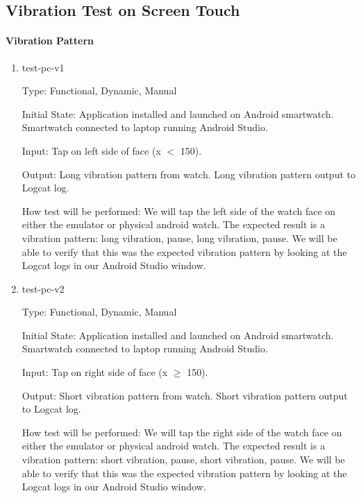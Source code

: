 \subsection{Vibration Test on Screen Touch}
		
\paragraph{Vibration Pattern}

\begin{enumerate}

\item{test-pc-v1\\}

Type: Functional, Dynamic, Manual
					
Initial State: Application installed and launched on Android smartwatch. Smartwatch connected to laptop running Android Studio.
					
Input: Tap on left side of face (x $<$ 150).
					
Output: Long vibration pattern from watch.
		Long vibration pattern output to Logcat log.
					
How test will be performed: We will tap the left side of the watch face on either the emulator or physical android watch. The expected result is a vibration pattern: long vibration, pause, long vibration, pause. We will be able to verify that this was the expected vibration pattern by looking at the Logcat logs in our Android Studio window.
					
\item{test-pc-v2\\}

Type: Functional, Dynamic, Manual
					
Initial State: Application installed and launched on Android smartwatch. Smartwatch connected to laptop running Android Studio.
					
Input: Tap on right side of face (x $\geq$ 150).
					
Output: Short vibration pattern from watch.
		Short vibration pattern output to Logcat log.
					
How test will be performed: We will tap the right side of the watch face on either the emulator or physical android watch. The expected result is a vibration pattern: short vibration, pause, short vibration, pause. We will be able to verify that this was the expected vibration pattern by looking at the Logcat logs in our Android Studio window.

\end{enumerate}
	
